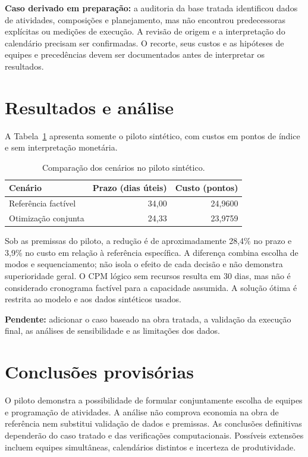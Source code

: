 \documentclass[12pt,a4paper]{article}
\begin{document}
\textbf{Caso derivado em preparação:} a auditoria da base tratada identificou dados de atividades, composições e planejamento, mas não encontrou predecessoras explícitas ou medições de execução. A revisão de origem e a interpretação do calendário precisam ser confirmadas. O recorte, seus custos e as hipóteses de equipes e precedências devem ser documentados antes de interpretar os resultados.

\section{Resultados e análise}
A Tabela~\ref{tab:piloto} apresenta somente o piloto sintético, com custos em pontos de índice e sem interpretação monetária.
\begin{table}[ht]
\centering
\caption{Comparação dos cenários no piloto sintético.}
\label{tab:piloto}
\begin{tabular}{lrr}
\toprule
Cenário & Prazo (dias úteis) & Custo (pontos)\\
\midrule
Referência factível & 34,00 & 24,9600\\
Otimização conjunta & 24,33 & 23,9759\\
\bottomrule
\end{tabular}
\end{table}

Sob as premissas do piloto, a redução é de aproximadamente 28,4\% no prazo e 3,9\% no custo em relação à referência específica. A diferença combina escolha de modos e sequenciamento; não isola o efeito de cada decisão e não demonstra superioridade geral. O CPM lógico sem recursos resulta em 30 dias, mas não é considerado cronograma factível para a capacidade assumida. A solução ótima é restrita ao modelo e aos dados sintéticos usados.

\textbf{Pendente:} adicionar o caso baseado na obra tratada, a validação da execução final, as análises de sensibilidade e as limitações dos dados.

\section{Conclusões provisórias}
O piloto demonstra a possibilidade de formular conjuntamente escolha de equipes e programação de atividades. A análise não comprova economia na obra de referência nem substitui validação de dados e premissas. As conclusões definitivas dependerão do caso tratado e das verificações computacionais. Possíveis extensões incluem equipes simultâneas, calendários distintos e incerteza de produtividade.
\end{document}
